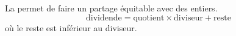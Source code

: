 La  permet de faire un partage équitable avec
des entiers. \vskip10pt\noindent
$$\text{dividende}=\text{quotient}\times\text{diviseur}+\text{reste}$$
où le reste  est inférieur au diviseur.